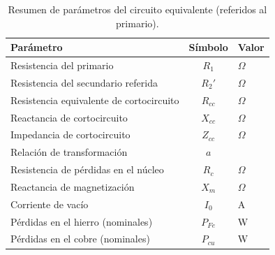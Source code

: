 \begin{table}[H]
    \centering
    \caption{Resumen de parámetros del circuito equivalente (referidos al primario).}
    \label{tab:parametros}
    \begin{tabularx}{\textwidth}{| X | c | X |}
        \hline
        \textbf{Parámetro} & \textbf{Símbolo} & \textbf{Valor} \\ \hline
        Resistencia del primario & $R_1$ & $\Omega$ \\ \hline
        Resistencia del secundario referida & $R_2'$ & $\Omega$ \\ \hline
        Resistencia equivalente de cortocircuito & $R_{cc}$ & $\Omega$ \\ \hline
        Reactancia de cortocircuito & $X_{cc}$ & $\Omega$ \\ \hline
        Impedancia de cortocircuito & $Z_{cc}$ & $\Omega$ \\ \hline
        Relación de transformación & $a$ & \\ \hline
        Resistencia de pérdidas en el núcleo & $R_c$ & $\Omega$ \\ \hline
        Reactancia de magnetización & $X_m$ & $\Omega$ \\ \hline
        Corriente de vacío & $I_0$ & A \\ \hline
        Pérdidas en el hierro (nominales) & $P_{Fe}$ & W \\ \hline
        Pérdidas en el cobre (nominales) & $P_{cu}$ & W \\ \hline
    \end{tabularx}
\end{table}
